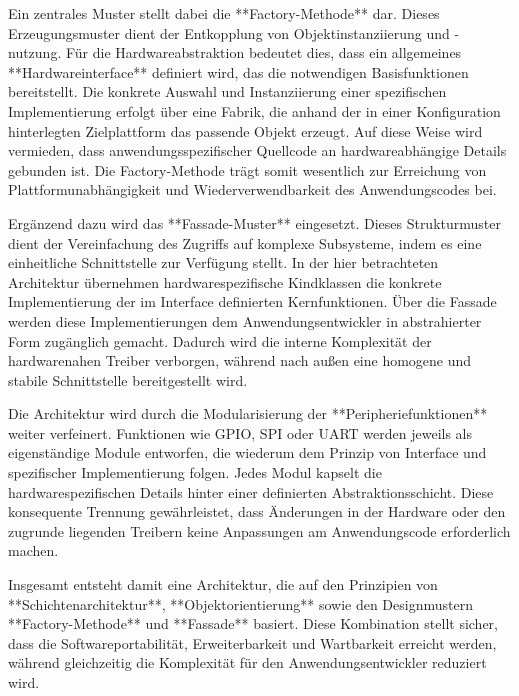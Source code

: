 Ein zentrales Muster stellt dabei die **Factory-Methode** dar. Dieses Erzeugungsmuster dient der Entkopplung von Objektinstanziierung und -nutzung. Für die Hardwareabstraktion bedeutet dies, dass ein allgemeines **Hardwareinterface** definiert wird, das die notwendigen Basisfunktionen bereitstellt. Die konkrete Auswahl und Instanziierung einer spezifischen Implementierung erfolgt über eine Fabrik, die anhand der in einer Konfiguration hinterlegten Zielplattform das passende Objekt erzeugt. Auf diese Weise wird vermieden, dass anwendungsspezifischer Quellcode an hardwareabhängige Details gebunden ist. Die Factory-Methode trägt somit wesentlich zur Erreichung von Plattformunabhängigkeit und Wiederverwendbarkeit des Anwendungscodes bei.

Ergänzend dazu wird das **Fassade-Muster** eingesetzt. Dieses Strukturmuster dient der Vereinfachung des Zugriffs auf komplexe Subsysteme, indem es eine einheitliche Schnittstelle zur Verfügung stellt. In der hier betrachteten Architektur übernehmen hardwarespezifische Kindklassen die konkrete Implementierung der im Interface definierten Kernfunktionen. Über die Fassade werden diese Implementierungen dem Anwendungsentwickler in abstrahierter Form zugänglich gemacht. Dadurch wird die interne Komplexität der hardwarenahen Treiber verborgen, während nach außen eine homogene und stabile Schnittstelle bereitgestellt wird.

Die Architektur wird durch die Modularisierung der **Peripheriefunktionen** weiter verfeinert. Funktionen wie GPIO, SPI oder UART werden jeweils als eigenständige Module entworfen, die wiederum dem Prinzip von Interface und spezifischer Implementierung folgen. Jedes Modul kapselt die hardwarespezifischen Details hinter einer definierten Abstraktionsschicht. Diese konsequente Trennung gewährleistet, dass Änderungen in der Hardware oder den zugrunde liegenden Treibern keine Anpassungen am Anwendungscode erforderlich machen.

Insgesamt entsteht damit eine Architektur, die auf den Prinzipien von **Schichtenarchitektur**, **Objektorientierung** sowie den Designmustern **Factory-Methode** und **Fassade** basiert. Diese Kombination stellt sicher, dass die Softwareportabilität, Erweiterbarkeit und Wartbarkeit erreicht werden, während gleichzeitig die Komplexität für den Anwendungsentwickler reduziert wird.































